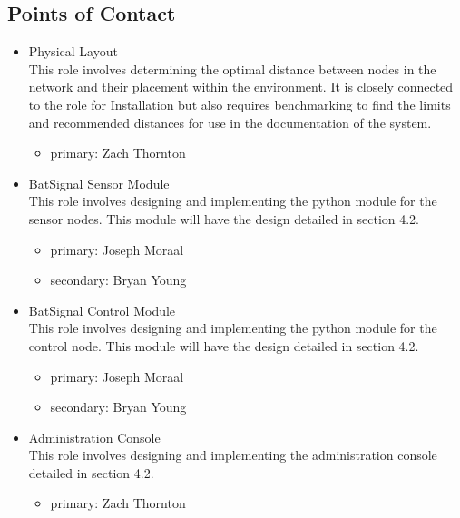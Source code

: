 \documentclass[11pt,a4paper]{article}
\begin{document}
\subsection{Points of Contact}
\begin{itemize}
    \item{Physical Layout} \\
    This role involves determining the optimal distance between nodes in the network and their placement within the environment.  It is closely connected to the role for Installation but also requires benchmarking to find the limits and recommended distances for use in the documentation of the system.
    \begin{itemize}
        \item{primary: Zach Thornton}
    \end{itemize}
    \item{BatSignal Sensor Module} \\
    This role involves designing and implementing the python module for the sensor nodes.  This module will have the design detailed in section 4.2.
    \begin{itemize}
        \item{primary: Joseph Moraal}
        \item{secondary: Bryan Young}
    \end{itemize}
    \item{BatSignal Control Module} \\
    This role involves designing and implementing the python module for the control node.  This module will have the design detailed in section 4.2.
    \begin{itemize}
        \item{primary: Joseph Moraal}
        \item{secondary: Bryan Young}
    \end{itemize}
    \item{Administration Console} \\
    This role involves designing and implementing the administration console detailed in section 4.2.
    \begin{itemize}
        \item{primary: Zach Thornton}

\end{itemize}
\end{itemize}
\end{document}
